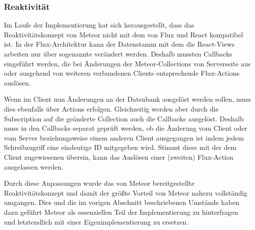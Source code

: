 \subsubsection{Reaktivität}
\label{sssec:elf_reaktivität}

Im Laufe der Implementierung hat sich herausgestellt, dass das
Reaktivitätskonzept von Meteor nicht mit dem von Flux und React kompatibel ist.
In der Flux-Architektur kann der Datenstamm mit dem die React-Views arbeiten nur
über sogenannte  verändert werden.  Deshalb mussten
Callbacks eingeführt werden, die bei Änderungen der Meteor-Collections von
Serverseite aus oder ausgehend von weiteren verbundenen Clients entsprechende
Flux-Actions auslösen.

Wenn im Client nun Änderungen an der Datenbank ausgelöst werden sollen, muss
dies ebenfalls über Actions erfolgen.  Gleichzeitig werden aber durch die
Subscription auf die geänderte Collection auch die Callbacks ausgelöst.  Deshalb
muss in den Callbacks separat geprüft werden, ob die Änderung vom Client oder
vom Server beziehungsweise einem anderen Client ausgegangen ist indem jedem
Schreibzugriff eine eindeutige ID mitgegeben wird.  Stimmt diese mit der dem
Client zugewiesenen überein, kann das Auslösen einer (zweiten) Flux-Action
ausgelassen werden.

Durch diese Anpassungen wurde das von Meteor bereitgestellte Reaktivitätskonzept
und damit der größte Vorteil von Meteor nahezu vollständig umgangen.  Dies und
die im vorigen Abschnitt beschriebenen Umstände haben dazu geführt Meteor als
essenziellen Teil der Implementierung zu hinterfragen und letztendlich
mit einer Eigenimplementierung zu ersetzen.
